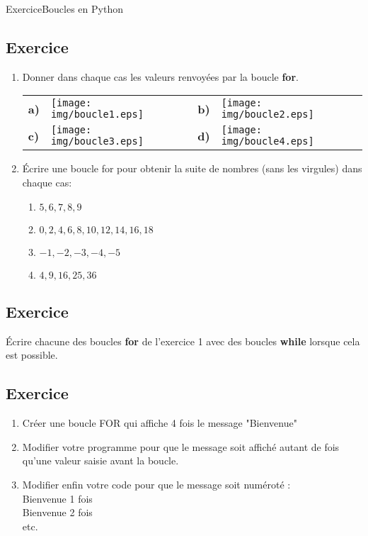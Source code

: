 \documentclass[11pt,a4paper]{article}
\newcounter{numexo}
\begin{document}
\begin{NSI}
{Exercice}{Boucles en Python}
\end{NSI}


\addtocounter{numexo}{1}
\subsection*{\Large Exercice \thenumexo }
\begin{enumerate}
\item Donner dans chaque cas les valeurs renvoyées par la boucle \textbf{for}.

\begin{tabular}{p{0.6cm}p{8cm}p{0.6cm}p{8cm}}
\textbf{a)} & \texttt{[image: img/boucle1.eps]} & \textbf{b)} &
\texttt{[image: img/boucle2.eps]}\\
\textbf{c)} & \texttt{[image: img/boucle3.eps]} & \textbf{d)} &
\texttt{[image: img/boucle4.eps]}\\
\end{tabular}\medskip

\item Écrire une boucle for pour obtenir la suite de nombres (sans les virgules) dans chaque cas:
\begin{enumerate}
\item $5, 6, 7, 8, 9$
\item $0, 2, 4, 6, 8, 10, 12, 14, 16, 18$
\item $-1, -2, -3, -4, -5$
\item $4, 9, 16, 25, 36$
\end{enumerate}
\end{enumerate}

\addtocounter{numexo}{1}
\subsection*{\Large Exercice \thenumexo }
Écrire chacune des boucles \textbf{for} de l'exercice 1 avec des boucles \textbf{while} lorsque cela est possible.


\addtocounter{numexo}{1}
\subsection*{\Large Exercice \thenumexo }
\begin{enumerate}
\item Créer une boucle FOR qui affiche 4 fois le message "Bienvenue"
\item Modifier votre programme pour que le message soit affiché autant de fois qu'une valeur saisie avant la boucle.
\item Modifier enfin votre code pour que le message soit numéroté :\\
Bienvenue 1 fois\\
Bienvenue 2 fois\\
etc.
\end{enumerate}
\end{document}
